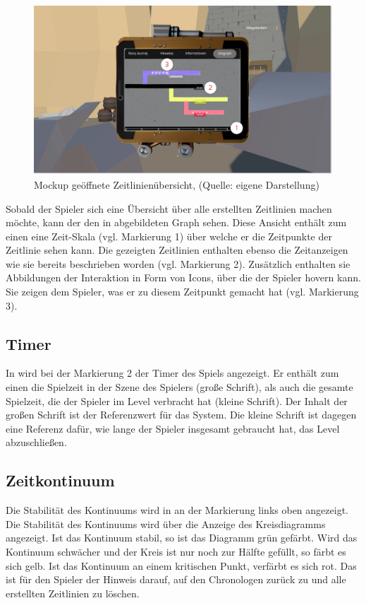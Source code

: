 \begin{figure}[ht]
\centering
\includegraphics[width=1\linewidth]{content/pictures/Graph-UI.jpg}
\caption{Mockup geöffnete Zeitlinienübersicht, (Quelle: eigene Darstellung)}
\label{fig:ui_graph_full}
\end{figure}

Sobald der Spieler sich eine Übersicht über alle erstellten Zeitlinien machen möchte, kann der den in  abgebildeten Graph sehen. Diese Ansicht enthält zum einen eine Zeit-Skala (vgl. Markierung 1) über welche er die Zeitpunkte der Zeitlinie sehen kann. Die gezeigten Zeitlinien enthalten ebenso die Zeitanzeigen wie sie bereits beschrieben worden (vgl. Markierung 2). Zusätzlich enthalten sie Abbildungen der Interaktion in Form von Icons, über die der Spieler hovern kann. Sie zeigen dem Spieler, was er zu diesem Zeitpunkt gemacht hat (vgl. Markierung 3).

\subsection{Timer}\label{sec:user_timer}
In  wird bei der Markierung 2 der Timer des Spiels angezeigt. Er enthält zum einen die Spielzeit in der Szene des Spielers (große Schrift), als auch die gesamte Spielzeit, die der Spieler im Level verbracht hat (kleine Schrift). Der Inhalt der großen Schrift ist der Referenzwert für das System. Die kleine Schrift ist dagegen eine Referenz dafür, wie lange der Spieler insgesamt gebraucht hat, das Level abzuschließen.
\subsection{Zeitkontinuum}\label{sec:kontinuum_ui}
Die Stabilität des Kontinuums wird in  an der Markierung links oben angezeigt. Die Stabilität des Kontinuums wird über die Anzeige des Kreisdiagramms angezeigt. Ist das Kontinuum stabil, so ist das Diagramm grün gefärbt. Wird das Kontinuum schwächer und der Kreis ist nur noch zur Hälfte gefüllt, so färbt es sich gelb. Ist das Kontinuum an einem kritischen Punkt, verfärbt es sich rot. Das ist für den Spieler der Hinweis darauf, auf den Chronologen zurück zu  und alle erstellten Zeitlinien zu löschen.

